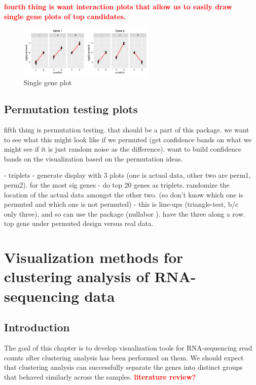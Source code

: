 \documentclass[11pt,a4paper,oldfontcommands,openany]{memoir}
\numberwithin{equation}{section} %
\begin{document}
\textbf{\textcolor{Red}{fourth thing is want interaction plots that allow us to easily draw single gene plots of top candidates.}}

\begin{figure}[H]
    \centering
    \includegraphics[width=0.6\textwidth]{DESeqGene}
    \caption{Single gene plot}
    \label{fig:DESeqGene}
\end{figure}

\section{Permutation testing plots}

fifth thing is permutation testing. that should be a part of this package. we want to see what this might look like if we permuted (get confidence bands on what we might see if it is just random noise as the difference). want to build confidence bands on the visualization based on the permutation ideas.

- triplets - generate display with 3 plots (one is actual data, other two are perm1, perm2). for the most sig genes
- do top 20 genes as triplets. randomize the location of the actual data amongst the other two. (so don’t know which one is permuted and which one is not permuted)
- this is line-ups (triangle-test, b/c only three), and so can use the package (nullabor \citealt{nullabor}). have the three along a row. top gene under permuted design versus real data.

\chapter{Visualization methods for clustering analysis of RNA-sequencing data}

\section{Introduction}

The goal of this chapter is to develop visualization tools for RNA-sequencing read counts after clustering analysis has been performed on them. We should expect that clustering analysis can successfully separate the genes into distinct groups that behaved similarly across the samples. \textbf{\textcolor{Red}{literature review?}}
\end{document}
